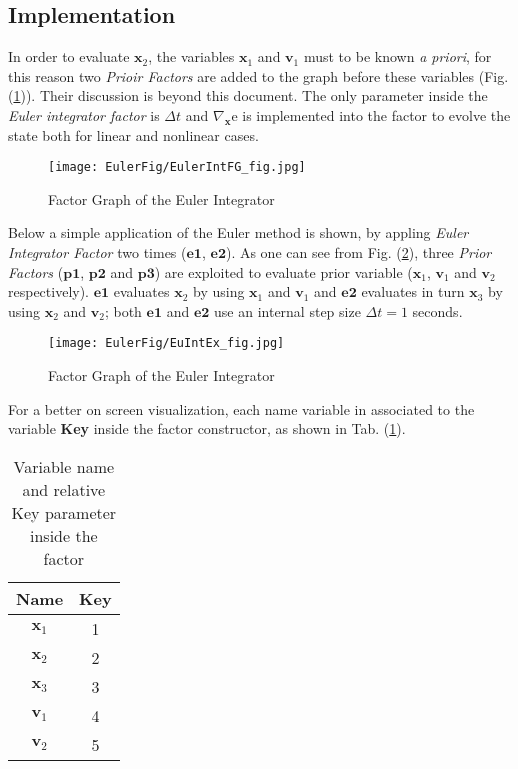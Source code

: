 \documentclass[12pt,a4paper]{book}
\begin{document}
\subsection*{Implementation}
In order to evaluate $\mathbf{x}_2$, the variables $\mathbf{x}_1$ and $\mathbf{v}_1$ must to be known \textit{a priori}, for this reason two \textit{Prioir Factors} are added to the graph before these variables (Fig. (\ref{EulerIntFG})). Their discussion is beyond this document. The only parameter inside the \textit{Euler integrator factor} is $\Delta t$ and $\nabla_\mathbf{x}\text{e}$ is implemented into the factor to evolve the state both for linear and nonlinear cases.\\
\begin{figure}[hbtp]
\centering
\texttt{[image: EulerFig/EulerIntFG\_fig.jpg]}
\caption{Factor Graph of the Euler Integrator}
\label{EulerIntFG}
\end{figure}
Below a simple application of the Euler method is shown, by appling \textit{Euler Integrator Factor} two times ($\mathbf{e1}$, $\mathbf{e2}$). As one can see from Fig. (\ref{EuIntExFG}), three \textit{Prior Factors} ($\mathbf{p1}$, $\mathbf{p2}$ and $\mathbf{p3}$) are exploited to evaluate prior variable ($\mathbf{x}_1$, $\mathbf{v}_1$ and $\mathbf{v}_2$ respectively). $\mathbf{e1}$ evaluates $\mathbf{x}_2$ by using $\mathbf{x}_1$ and $\mathbf{v}_1$ and $\mathbf{e2}$ evaluates in turn $\mathbf{x}_3$ by using $\mathbf{x}_2$ and $\mathbf{v}_2$; both $\mathbf{e1}$ and $\mathbf{e2}$ use an internal step size $\Delta t=1$ seconds.\\
\begin{figure}[hbtp]
\centering
\texttt{[image: EulerFig/EuIntEx\_fig.jpg]}
\caption{Factor Graph of the Euler Integrator}
\label{EuIntExFG}
\end{figure}
For a better on screen visualization, each name variable in associated to the variable \textbf{Key} inside the factor constructor, as shown in Tab. (\ref{KeyTab}).\\
\begin{table}[]
\centering
\begin{tabular}{c|c}
\textbf{Name} & \textbf{Key} \\ \hline
$\mathbf{x}_1$         & 1            \\
$\mathbf{x}_2$         & 2            \\
$\mathbf{x}_3$         & 3            \\
$\mathbf{v}_1$         & 4            \\
$\mathbf{v}_2$         & 5           
\end{tabular}
\caption{Variable name and relative Key parameter inside the factor}
\label{KeyTab}
\end{table}
\end{document}
